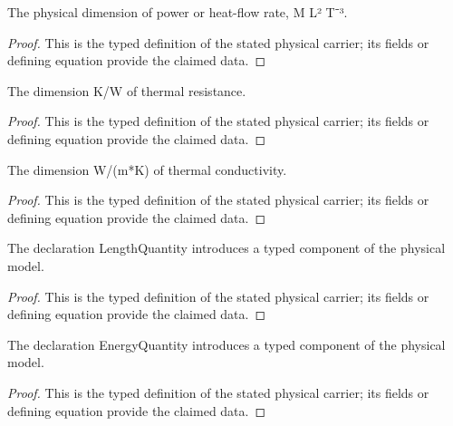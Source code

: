 \begin{definition}
  \label{def:physics:IPhO_2026_4_C_7:aux002}
  The physical dimension of power or heat-flow rate, M L² T⁻³.
\end{definition}
\begin{proof}
  This is the typed definition of the stated physical carrier; its fields or defining equation provide the claimed data.
\end{proof}

\begin{definition}
  \label{def:physics:IPhO_2026_4_C_7:aux003}
  The dimension K/W of thermal resistance.
\end{definition}
\begin{proof}
  This is the typed definition of the stated physical carrier; its fields or defining equation provide the claimed data.
\end{proof}

\begin{definition}
  \label{def:physics:IPhO_2026_4_C_7:aux004}
  The dimension W/(m*K) of thermal conductivity.
\end{definition}
\begin{proof}
  This is the typed definition of the stated physical carrier; its fields or defining equation provide the claimed data.
\end{proof}

\begin{definition}
  \label{def:physics:IPhO_2026_4_C_7:aux005}
  The declaration LengthQuantity introduces a typed component of the physical model.
\end{definition}
\begin{proof}
  This is the typed definition of the stated physical carrier; its fields or defining equation provide the claimed data.
\end{proof}

\begin{definition}
  \label{def:physics:IPhO_2026_4_C_7:aux006}
  The declaration EnergyQuantity introduces a typed component of the physical model.
\end{definition}
\begin{proof}
  This is the typed definition of the stated physical carrier; its fields or defining equation provide the claimed data.
\end{proof}

